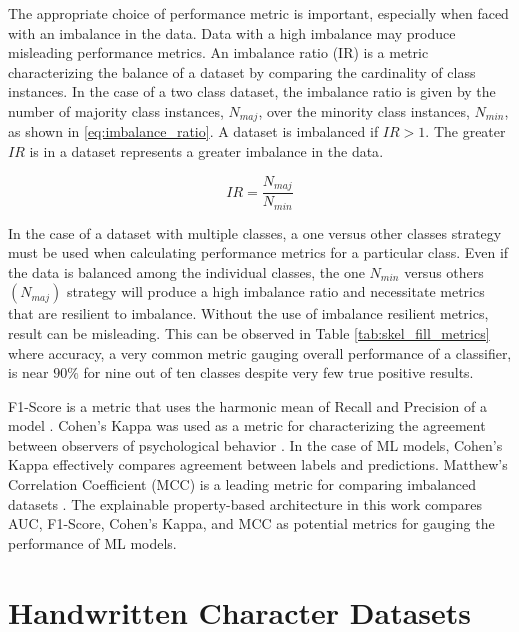 The appropriate choice of performance metric is important, especially when faced
with an imbalance in the data. Data with a high imbalance may produce misleading
performance metrics. An imbalance ratio (IR) is a metric characterizing the
balance of a dataset by comparing the cardinality of class
instances. In the case of a two class dataset, the
imbalance ratio is given by the number of majority class instances, $N_{maj}$,
over the minority class instances, $N_{min}$, as shown in
\eqref{eq:imbalance_ratio}.  A dataset is imbalanced if $IR > 1$.  The greater
$IR$ is in a dataset represents a greater imbalance in the data\cite{KHAN2024122778}.

\begin{equation}\label{eq:imbalance_ratio}
    IR = \frac{N_{maj}}{N_{min}}
\end{equation}

In the case of a dataset with multiple classes, a one versus other classes
strategy must be used when calculating performance metrics for a particular
class.  Even if the data is balanced among the individual classes, the one
$N_{min}$ versus others $(N_{maj})$ strategy will produce a high imbalance ratio
and necessitate metrics that are resilient to imbalance.  Without the use of
imbalance resilient metrics, result can be misleading.  This can be observed in
Table \ref{tab:skel_fill_metrics} where accuracy, a very common metric gauging
overall performance of a classifier, is near $90\%$ for nine out of ten classes
despite very few true positive results.

F1-Score is a metric that uses the harmonic mean of Recall and Precision of a
model \cite{sasaki2007truth}. Cohen's Kappa was used as a metric for
characterizing the agreement between observers of psychological behavior
\cite{Cohen1960ACO,ben2008relationship}. In the case of ML models, Cohen's Kappa
effectively compares agreement between labels and predictions. Matthew's
Correlation Coefficient (MCC) is a leading metric for comparing imbalanced
datasets \cite{MATTHEWS1975442, 9385097}. The explainable property-based
architecture in this work compares AUC, F1-Score, Cohen's Kappa, and MCC as
potential metrics for gauging the performance of ML models.

\section{Handwritten Character Datasets}

